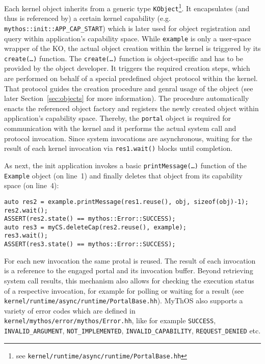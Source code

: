 \noindent Each kernel object inherits from a generic type
\texttt{KObject}\footnote{see
\texttt{kernel/runtime/async/runtime/PortalBase.hh}}.
It encapsulates (and thus is referenced by) a certain kernel capability (e.g.
\texttt{mythos::init::APP\_CAP\_START}) which is later used for object
registration and query within application's capability space. While
\texttt{example} is only a user-space wrapper of the KO, the actual object
creation within the kernel is triggered by its \texttt{create(\ldots)} function.
The \texttt{create(\ldots)} function is object-specific and has to be provided
by the object developer. It triggers the required creation steps, which are
performed on behalf of a special predefined object protocol within the kernel.
That protocol guides the creation procedure and genral usage of the object (see
later Section~\ref{sec:objects} for more information). The procedure
automatically enacts the referenced object factory and registers the newly
created object within application's capability space.
Thereby, the \texttt{portal} object is required for communication with the
kernel and it performs the actual system call and protocol invocation. Since
system invocations are asynchronous, waiting for the result of each kernel
invocation via \texttt{res1.wait()} blocks until completion.

As next, the init application invokes a basic \texttt{printMessage(\ldots)}
function of the \texttt{Example} object (on line~1) and finally deletes that
object from its capability space (on line~4):

\lstset{language=c++}
\begin{lstlisting}
auto res2 = example.printMessage(res1.reuse(), obj, sizeof(obj)-1);
res2.wait();
ASSERT(res2.state() == mythos::Error::SUCCESS);
auto res3 = myCS.deleteCap(res2.reuse(), example);
res3.wait();
ASSERT(res3.state() == mythos::Error::SUCCESS);
\end{lstlisting}

\noindent For each new invocation the same protal is reused. The result of each
invocation is a reference to the engaged portal and its invocation buffer.
Beyond retrieving system call results, this mechanism also allows for checking
the execution status of a respective invocation, for example for polling or
waiting for a result (see \texttt{kernel/runtime/async/runtime/PortalBase.hh}).
MyThOS also supports a variety of error codes which are defined in
\texttt{kernel/mythos/error/mythos/Error.hh}, like for example \texttt{SUCCESS},
\texttt{INVALID\_ARGUMENT}, \texttt{NOT\_IMPLEMENTED},
\texttt{INVALID\_CAPABILITY}, \texttt{REQUEST\_DENIED} etc.

